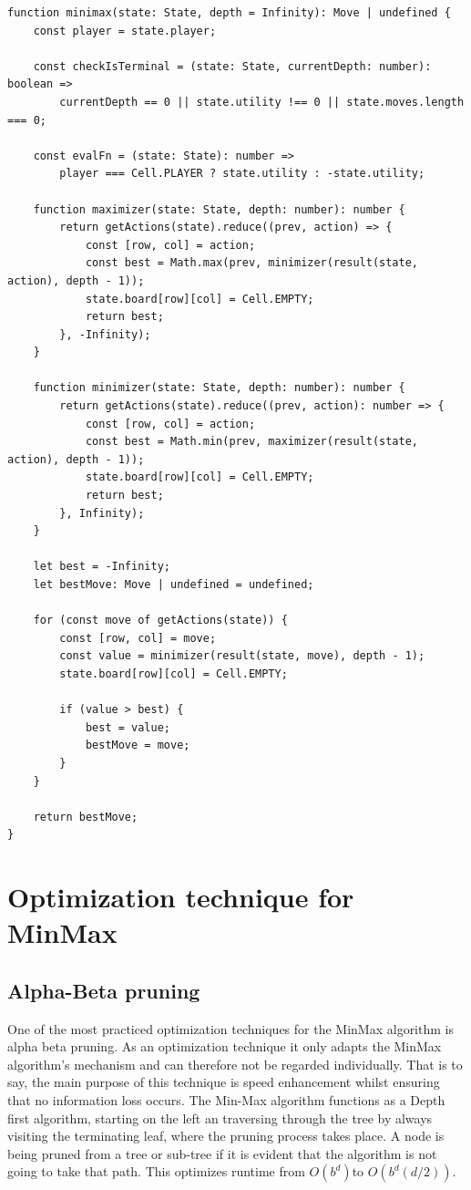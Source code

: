\documentclass[conference,pdf,table,xcdraw, utf8]{IEEEtran}
\begin{document}
\begin{lstlisting}[style=ts,linewidth=\columnwidth,breaklines=true,
caption=MinMax Connect-4 source-code]
function minimax(state: State, depth = Infinity): Move | undefined {
	const player = state.player;

	const checkIsTerminal = (state: State, currentDepth: number): boolean =>
		currentDepth == 0 || state.utility !== 0 || state.moves.length === 0;

	const evalFn = (state: State): number =>
		player === Cell.PLAYER ? state.utility : -state.utility;

	function maximizer(state: State, depth: number): number {
		return getActions(state).reduce((prev, action) => {
			const [row, col] = action;
			const best = Math.max(prev, minimizer(result(state, action), depth - 1));
			state.board[row][col] = Cell.EMPTY;
			return best;
		}, -Infinity);
	}

	function minimizer(state: State, depth: number): number {
		return getActions(state).reduce((prev, action): number => {
			const [row, col] = action;
			const best = Math.min(prev, maximizer(result(state, action), depth - 1));
			state.board[row][col] = Cell.EMPTY;
			return best;
		}, Infinity);
	}
	
	let best = -Infinity;
	let bestMove: Move | undefined = undefined;

	for (const move of getActions(state)) {
		const [row, col] = move;
		const value = minimizer(result(state, move), depth - 1);
		state.board[row][col] = Cell.EMPTY;

		if (value > best) {
			best = value;
			bestMove = move;
		}
	}

	return bestMove;
}
\end{lstlisting}


\section{Optimization technique for MinMax}
\subsection{Alpha-Beta pruning}
One of the most practiced optimization techniques for the MinMax algorithm is alpha beta pruning. As an optimization technique it only adapts the MinMax algorithm's mechanism and can therefore not be regarded individually. \cite{nasa2018alpha} That is to say, the main purpose of this technique is speed enhancement whilst ensuring that no information loss occurs.
The Min-Max algorithm functions as a Depth first algorithm, starting on the left an traversing through the tree by always visiting the terminating leaf, where the pruning process takes place.
A node is being pruned from a tree or sub-tree if it is evident that the algorithm is not going to take that path. This optimizes runtime from $O(b^d)$to $O(b^d(d/2))$.
\end{document}
